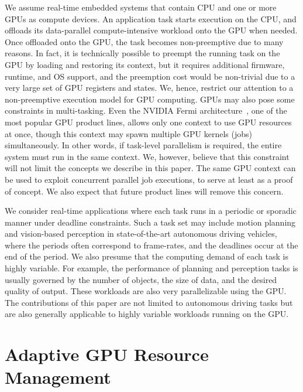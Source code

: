 \documentclass[times, 10pt, twocolumn]{article}
\begin{document}
We assume real-time embedded systems that contain CPU and one or more GPUs as compute devices.
An application task starts execution on the CPU, and offloads its
data-parallel compute-intensive workload onto the GPU when needed.
Once offloaded onto the GPU, the task becomes non-preemptive due to many
reasons.
In fact, it is technically possible to preempt the running task on the
GPU by loading and restoring its context, but it requires additional
firmware, runtime, and OS support, and the preemption cost would be
non-trivial due to a very large set of GPU registers and states.
We, hence, restrict our attention to a non-preemptive execution model for
GPU computing.
GPUs may also pose some constraints in multi-tasking.
Even the NVIDIA Fermi architecture~\cite{Fermi}, one of the most popular
GPU product lines, allows only one context to use GPU resources at
once, though this context may spawn multiple GPU kernels (jobs)
simultaneously.
In other words, if task-level parallelism is required, the entire system
must run in the same context.
We, however, believe that this constraint will not limit the 
concepts we describe in this paper.
The same GPU context can be used to exploit concurrent parallel job
executions, to serve at least as a proof of concept. 
We also expect that future product lines will remove this concern.

We consider real-time applications where each task runs in a periodic or
sporadic manner under deadline constraints.
Such a task set may include motion planning and 
vision-based perception in state-of-the-art autonomous driving
vehicles, where the periods often correspond to frame-rates, and the
deadlines occur at the end of the period.
We also presume that the computing demand of each task is highly
variable.
For example, the performance of planning and perception tasks is usually
governed by the number of objects, the size of data, and the desired
quality of output.
These workloads are also very parallelizable using the GPU.
The contributions of this paper are not limited to autonomous driving tasks but
are also generally applicable to highly variable workloads running on the
GPU.

\section{Adaptive GPU Resource Management}
\label{sec:adaptivity_support}
\end{document}
